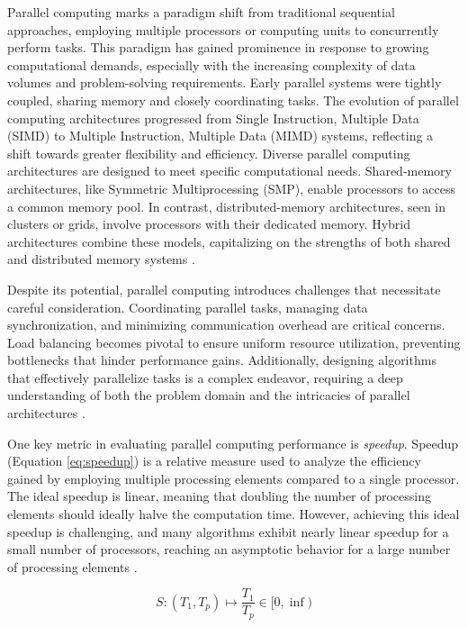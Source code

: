 \documentclass[Ingles]{phdthesis}
\begin{document}
Parallel computing marks a paradigm shift from traditional sequential approaches, employing multiple processors or computing units to concurrently perform tasks. This paradigm has gained prominence in response to growing computational demands, especially with the increasing complexity of data volumes and problem-solving requirements. Early parallel systems were tightly coupled, sharing memory and closely coordinating tasks. The evolution of parallel computing architectures progressed from Single Instruction, Multiple Data (SIMD) to Multiple Instruction, Multiple Data (MIMD) systems, reflecting a shift towards greater flexibility and efficiency. Diverse parallel computing architectures are designed to meet specific computational needs. Shared-memory architectures, like Symmetric Multiprocessing (SMP), enable processors to access a common memory pool. In contrast, distributed-memory architectures, seen in clusters or grids, involve processors with their dedicated memory. Hybrid architectures combine these models, capitalizing on the strengths of both shared and distributed memory systems \cite{matloff2012}.

Despite its potential, parallel computing introduces challenges that necessitate careful consideration. Coordinating parallel tasks, managing data synchronization, and minimizing communication overhead are critical concerns. Load balancing becomes pivotal to ensure uniform resource utilization, preventing bottlenecks that hinder performance gains. Additionally, designing algorithms that effectively parallelize tasks is a complex endeavor, requiring a deep understanding of both the problem domain and the intricacies of parallel architectures \cite{grama2003,matloff2012}.

One key metric in evaluating parallel computing performance is \textit{speedup}. Speedup (Equation \ref{eq:speedup}) is a relative measure used to analyze the efficiency gained by employing multiple processing elements compared to a single processor. The ideal speedup is linear, meaning that doubling the number of processing elements should ideally halve the computation time. However, achieving this ideal speedup is challenging, and many algorithms exhibit nearly linear speedup for a small number of processors, reaching an asymptotic behavior for a large number of processing elements \cite{grama2003,matloff2012}.

\begin{equation}
  S \colon (T_1, T_p) \mapsto \frac{T_1}{T_p} \in [0,\inf)
  \label{eq:speedup}
\end{equation}
\end{document}
